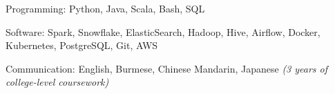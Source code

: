 

\begin{cvskills}

  \cvskill
  {Programming:} %
  {Python, Java, Scala, Bash, SQL}

  \cvskill
  {Software:} %
  {Spark, Snowflake, ElasticSearch, Hadoop, Hive, Airflow, Docker, Kubernetes, PostgreSQL, Git, AWS} %

  \cvskill
  {Communication:} %
  {English, Burmese, Chinese Mandarin, Japanese \bodyfontlight\emph{(3 years of college-level coursework)}} %

\end{cvskills}
